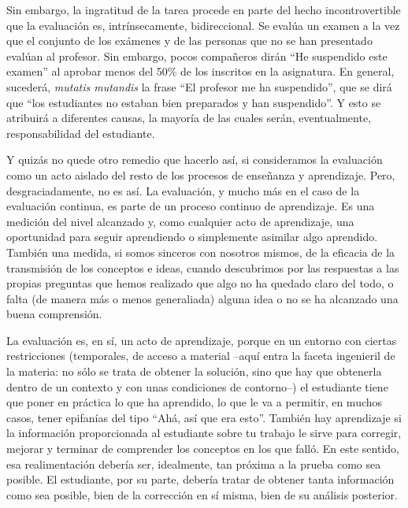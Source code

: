 \documentclass[twoside,10pt]{article}
\begin{document}
\begin{multicols}{2}
Sin embargo, la ingratitud de la tarea procede en parte del hecho
incontrovertible que la evaluación es, intrínsecamente,
bidireccional. Se evalúa un examen a la vez que el conjunto de los
exámenes y de las personas que no se han presentado evalúan al
profesor. Sin embargo, pocos compañeros dirán ``He suspendido este
examen'' al aprobar menos del 50\% de los inscritos en la
asignatura. En general, sucederá, {\em mutatis mutandis} la frase ``El
profesor me ha suspendido'', que se dirá que ``los estudiantes no
estaban bien preparados y han suspendido''. Y esto se atribuirá a
diferentes causas, la mayoría de las cuales serán, eventualmente,
responsabilidad del estudiante.

Y quizás no quede otro remedio que hacerlo así, si consideramos la
evaluación como un acto aislado del resto de los procesos de enseñanza
y aprendizaje. Pero, desgraciadamente, no es así. La evaluación, y
mucho más en el caso de la evaluación continua, es parte de un proceso
continuo de aprendizaje. Es una medición del nivel alcanzado y, como
cualquier acto de aprendizaje, una oportunidad para seguir aprendiendo
o simplemente asimilar algo aprendido. 
	También una medida, si somos sinceros con nosotros mismos, de la eficacia de la transmisión de los conceptos e ideas, cuando descubrimos por las respuestas a las propias preguntas que hemos realizado que algo no ha quedado claro del todo, o falta (de manera más o menos generaliada) alguna idea o no se ha alcanzado una buena comprensión.

\noindent 
\bigskip

La evaluación es, en sí, un acto de aprendizaje, porque en un entorno
con ciertas restricciones (temporales, de acceso a material --aquí entra la faceta ingenieril de la materia: no sólo se trata de obtener la solución, sino que hay que obtenerla dentro de un contexto y con unas condiciones de contorno--) el
estudiante tiene que poner en práctica lo que ha aprendido, lo que le
va a permitir, en muchos casos, tener epifanías del tipo ``Ahá, así
que era esto''.
También hay aprendizaje si la información proporcionada al estudiante sobre tu
trabajo le sirve para corregir, mejorar y terminar de comprender los conceptos
en los que falló.
En este sentido, esa realimentación debería ser, idealmente, tan próxima a la
prueba como sea posible. El estudiante, por su parte, debería tratar de obtener
tanta información como sea posible, bien de la corrección en sí misma, bien de
su análisis posterior.


\end{multicols}
\end{document}
